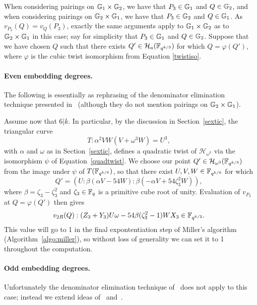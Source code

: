 When considering pairings on $\mathbb{G}_{1} \times \mathbb{G}_{2}$, we have that $P_3 \in \mathbb{G}_{1}$ and $Q \in \mathbb{G}_{2}$, and when considering pairings on $\mathbb{G}_{2} \times \mathbb{G}_{1}$, we have that $P_3 \in \mathbb{G}_{2}$ and $Q \in \mathbb{G}_{1}$.
As $v_{P_3}(Q) = v_{Q}(P_3)$, exactly the same arguments apply to $\mathbb{G}_{1} \times \mathbb{G}_{2}$ as to $\mathbb{G}_{2} \times \mathbb{G}_{1}$ in this case; 
say for simplicity that $P_3 \in \mathbb{G}_{1}$ and $Q \in \mathbb{G}_{2}$.
Suppose that we have chosen $Q$ such that there exists $Q' \in \mathcal{H}_a(\mathbb{F}_{q^{k/3}})$ for which $Q = \varphi(Q')$, where $\varphi$ is the 
cubic twist isomorphism from Equation \ref{twistiso}.

\paragraph*{Even embedding degrees.}

The following is essentially as rephrasing of the denominator elimination technique presented in~\cite{2010/Gu} (although they do not mention pairings on $\mathbb{G}_{2} \times \mathbb{G}_{1}$).

Assume now that $6|k$. In particular, by the discussion in
Section~\ref{sextic}, the triangular curve
\[T:\alpha^2VW(V + \omega^3W) = U^3,\]
with $\alpha$ and $\omega$ as in Section~\ref{sextic},
defines a quadratic twist of $\mathcal{H}_{\omega^3}$ via the isomorphism
$\psi$ of Equation~\ref{quadtwist}.
We choose our point $Q' \in \mathcal{H}_{\omega^3}(\mathbb{F}_{q^{k/3}})$ from the
image under $\psi$ of $T(\mathbb{F}_{q^{k/6}})$, so that there exist $U, V, W \in \mathbb{F}_{q^{k/6}}$ for which
$$Q' = (U:\beta(\alpha V - 54W) : \beta(-\alpha V + 54\zeta_3^2 W)),$$
where $\beta = \zeta_3-\zeta_3^2$ and 
$\zeta_3 \in \mathbb{F}_{q}$ is a primitive cube root of unity.
Evaluation of $v_{P_3}$ at $Q = \varphi(Q')$ then gives
\[v_{2R}(Q) : (Z_3 + Y_3) U\omega - 54\beta(\zeta_3^2-1)W X_3 \in \mathbb{F}_{q^{k/2}}.\]
This value will go to 1 in the final expontentiation step of Miller's algorithm 
(Algorithm~\ref{algo:miller}), so without loss of generality we can set it to 1 throughout the computation.

\paragraph*{Odd embedding degrees.}

Unfortunately the denominator elimination technique of~\cite{2010/Gu} does not apply to this case;
instead we extend ideas of~\cite{2008/lin} and~\cite{2009/deg15}.

